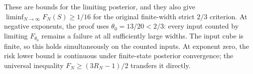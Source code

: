 These are bounds for the limiting posterior, and they also give
$\liminf_{N\to\infty}F_N(S)\ge1/16$ for the original finite-width
strict $2/3$ criterion.  At negative exponents, the proof uses
$\theta_0=13/20<2/3$: every input counted by limiting
$F_{\theta_0}$ remains a failure at all sufficiently large widths.
The input cube is finite, so this holds simultaneously on the
counted inputs.  At exponent zero, the risk lower bound is continuous
under finite-state posterior convergence; the universal inequality
$F_N\ge(3R_N-1)/2$ transfers it directly.
